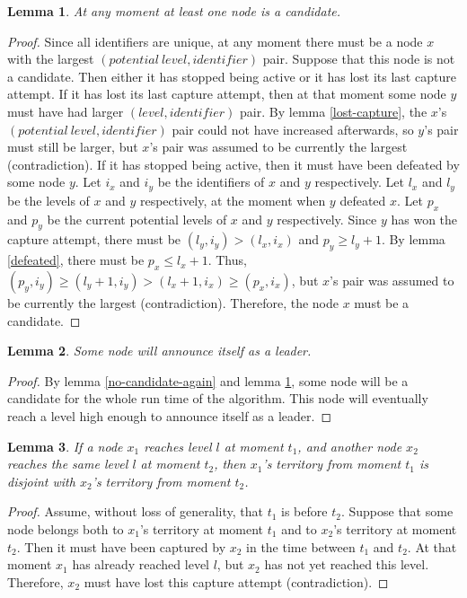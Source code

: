 \documentclass[a4paper,12pt]{article}
\newtheorem{lemma}{Lemma}
\newcommand{\midentifier}{\mathit{identifier}}
\newcommand{\mlevel}{\mathit{level}}
\newcommand{\mpotentiallevel}{\mathit{potential \ level}}
\begin{document}
\begin{lemma}\label{always-one-candidate}
    At any moment at least one node is a candidate.
\end{lemma}
\begin{proof}
    Since all identifiers are unique,
    at any moment there must be a node $x$ with the largest $(\mpotentiallevel, \midentifier)$ pair.
    Suppose that this node is not a candidate.
    Then either it has stopped being active or it has lost its last capture attempt.
    If it has lost its last capture attempt,
    then at that moment some node $y$ must have had larger $(\mlevel, \midentifier)$ pair.
    By lemma \ref{lost-capture}, the $x$'s $(\mpotentiallevel, \midentifier)$ pair
    could not have increased afterwards, so $y$'s pair must still be larger,
    but $x$'s pair was assumed to be currently the largest (contradiction).
    If it has stopped being active, then it must have been defeated by some node $y$.
    Let $i_x$ and $i_y$ be the identifiers of $x$ and $y$ respectively.
    Let $l_x$ and $l_y$ be the levels of $x$ and $y$ respectively, at the moment when $y$ defeated $x$.
    Let $p_x$ and $p_y$ be the current potential levels of $x$ and $y$ respectively.
    Since $y$ has won the capture attempt, there must be $(l_y, i_y) > (l_x, i_x)$ and $p_y \geq l_y + 1$.
    By lemma \ref{defeated}, there must be $p_x \leq l_x + 1$.
    Thus, $(p_y, i_y) \geq (l_y + 1, i_y) > (l_x + 1, i_x) \geq (p_x, i_x)$,
    but $x$'s pair was assumed to be currently the largest (contradiction).
    Therefore, the node $x$ must be a candidate.
\end{proof}

\begin{lemma}\label{min-one-leader}
    Some node will announce itself as a leader.
\end{lemma}
\begin{proof}
    By lemma \ref{no-candidate-again} and lemma \ref{always-one-candidate},
    some node will be a candidate for the whole run time of the algorithm.
    This node will eventually reach a level high enough to announce itself as a leader.
\end{proof}

\begin{lemma}\label{disjoint-territories}
    If a node $x_1$ reaches level $l$ at moment $t_1$,
    and another node $x_2$ reaches the same level $l$ at moment $t_2$,
    then $x_1$'s territory from moment $t_1$ is disjoint with $x_2$'s territory from moment $t_2$.
\end{lemma}
\begin{proof}
    Assume, without loss of generality, that $t_1$ is before $t_2$.
    Suppose that some node belongs both to $x_1$'s territory at moment $t_1$ and to $x_2$'s territory at moment $t_2$.
    Then it must have been captured by $x_2$ in the time between $t_1$ and $t_2$.
    At that moment $x_1$ has already reached level $l$, but $x_2$ has not yet reached this level.
    Therefore, $x_2$ must have lost this capture attempt (contradiction).
\end{proof}
\end{document}
